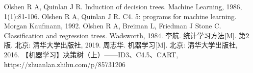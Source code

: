 \documentclass[fontset=windows]{article}
\begin{document}
\begin{thebibliography}{100}  
Olshen R A, Quinlan J R. Induction of decision trees. Machine Learning, 1986, 1(1):81-106.
Olshen R A, Quinlan J R. C4. 5: programs for machine learning. Morgan Kaufmann, 1992.
Olshen R A, Breiman L, Friedman J Stone C. Classification and regression trees. Wadsworth, 1984.
李航. 统计学习方法[M]. 第2版. 北京: 清华大学出版社, 2019.
周志华. 机器学习[M]. 北京: 清华大学出版社, 2016.
【机器学习】决策树（上）——ID3、C4.5、CART, https://zhuanlan.zhihu.com/p/85731206
\end{thebibliography}
\end{document}
